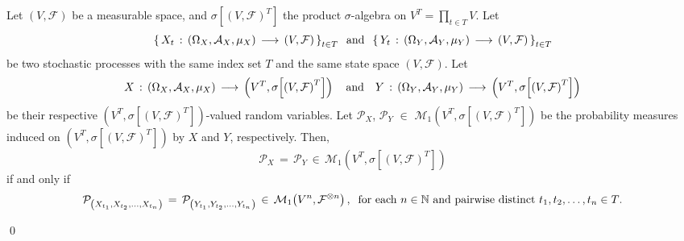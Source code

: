 \begin{theorem}
\mbox{}\vskip 0cm
\noindent
Let $\left(V,\mathcal{F}\right)$ be a measurable space, and
$\sigma\!\left[(V,\mathcal{F})^{T}\right]$ the product $\sigma$-algebra
on $V^{T} = \prod_{t \in T}V$.
Let
\begin{equation*}
\left\{\,X_{t}\,:\,(\Omega_{X},\mathcal{A}_{X},\mu_{X})\,\longrightarrow\,(V,\mathcal{F})\,\right\}_{t \in T}
\;\;\textnormal{and}\;\;
\left\{\,Y_{t}\,:\,(\Omega_{Y},\mathcal{A}_{Y},\mu_{Y})\,\longrightarrow\,(V,\mathcal{F})\,\right\}_{t \in T}
\end{equation*}
be two stochastic processes with the same index set $T$ and
the same state space $\left(V,\mathcal{F}\right)$.
Let
\begin{equation*}
X \,:\, \left(\Omega_{X},\mathcal{A}_{X},\mu_{X}\right)\,\longrightarrow\,\left(V^{T},\sigma\!\left[\left(V,\mathcal{F}\right)^{T}\right]\right)
\quad\textnormal{and}\quad
Y \,:\, \left(\Omega_{Y},\mathcal{A}_{Y},\mu_{Y}\right)\,\longrightarrow\,\left(V^{T},\sigma\!\left[\left(V,\mathcal{F}\right)^{T}\right]\right)
\end{equation*}
be their respective
$\left(V^{T},\sigma\!\left[\left(V,\mathcal{F}\right)^{T}\right]\right)$-valued random variables.
Let $\mathcal{P}_{X}$, $\mathcal{P}_{Y}$ $\in$
$\mathcal{M}_{1}\!\left(V^{T},\sigma\!\left[\left(V,\mathcal{F}\right)^{T}\right]\right)$
be the probability measures induced on
$\left(V^{T},\sigma\!\left[\left(V,\mathcal{F}\right)^{T}\right]\right)$ by $X$ and $Y$, respectively.
Then,
\begin{equation*}
\mathcal{P}_{X} \,=\, \mathcal{P}_{Y}
\,\in\, \mathcal{M}_{1}\!\left(V^{T},\sigma\!\left[\left(V,\mathcal{F}\right)^{T}\right]\right)
\end{equation*}
if and only if
\begin{equation*}
\mathcal{P}_{\left(X_{t_{1}},X_{t_{2}},\ldots,X_{t_{n}}\right)}
\,=\,
\mathcal{P}_{\left(Y_{t_{1}},Y_{t_{2}},\ldots,Y_{t_{n}}\right)}
\,\in\, \mathcal{M}_{1}\!\left(V^{n},\mathcal{F}^{\otimes n}\right),
\;\;
\textnormal{for each $n \in \mathbb{N}$ and pairwise distinct $t_{1}, t_{2}, \ldots, t_{n} \in T$}.
\end{equation*}
\end{theorem}
\proof

\qed

